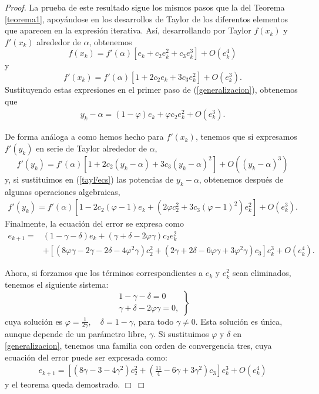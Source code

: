 \begin{proof}
	La prueba de este resultado sigue los mismos pasos que la del Teorema \ref{teorema1}, apoyándose en los desarrollos de Taylor de los diferentos elementos que aparecen en la expresión iterativa. Así, desarrollando por Taylor $f(x_k)$ y $f'(x_k)$ alrededor de $\alpha$, obtenemos
	\begin{equation*} \label{tay1ecs}
	f(x_k)=f'(\alpha)\left[e_k+c_2e_k^2+c_3e_k^3\right]+O(e_k^4)
	\end{equation*}
	y
	\begin{equation*}\label{tay2ecs}
	f'(x_k)=f'(\alpha)\left[1+2c_2e_k+3c_3e_k^2\right]+O(e_k^3).
	\end{equation*}
	Sustituyendo estas expresiones en el primer paso de (\ref{generalizacion}), obtenemos que
	\begin{align*}\label{eqy}
	y_k-\alpha  \nonumber =  (1-\varphi)e_k+\varphi c_2e_k^2+O(e_k^3).
	\end{align*}
	
	De forma análoga a como hemos hecho para $f'(x_k)$, tenemos que si expresamos $f'(y_k)$ en serie de Taylor alrededor de $\alpha$,
	\begin{equation}\label{tayFecs}
	f'(y_k) = f'(\alpha)\left[1+2c_2(y_k-\alpha)+3c_3(y_k-\alpha)^2\right]+O((y_k-\alpha)^3)
	\end{equation}
	y, si sustituimos en (\ref{tayFecs}) las potencias de $y_k-\alpha$, obtenemos después de algunas operaciones algebraicas,
	\begin{align*} \label{tay5ecs}
	f'(y_k)=f'(\alpha)\left[1-2c_2(\varphi-1)e_k+(2\varphi c_2^2+3c_3(\varphi -1)^2)e_k^2\right]+O(e_k^3).
	\end{align*}
	Finalmente, la ecuación del error se expresa como
	\begin{align}
	e_{k+1} = & (1-\gamma-\delta)e_k+(\gamma+\delta-2\varphi\gamma)c_2e_k^2\\\nonumber &+\left[(8\varphi\gamma-2\gamma-2\delta-4\varphi^2\gamma)c_2^2+(2\gamma+2\delta-6\varphi\gamma+3\varphi^2\gamma)c_3\right]e_k^3+O(e_k^4).
	\end{align}
	
	Ahora, si forzamos que los términos correspondientes a $e_k$ y $e_k^2$ sean eliminados, tenemos el siguiente sistema:
	\begin{equation*}
	\left.
	\begin{array}{r}
	1-\gamma-\delta=0 \\
	\gamma+\delta-2\varphi\gamma=0,
	\end{array}
	\right\}
	\end{equation*}
	cuya solución es $\varphi=\frac{1}{2\gamma},\quad \delta=1-\gamma$, para todo $\gamma \neq 0$. Esta solución es única, aunque depende de un parámetro libre, $\gamma$. Si sustituimos $\varphi$ y $\delta$ en \eqref{generalizacion}, tenemos una familia con orden de convergencia tres, cuya ecuación del error puede ser expresada como:
	\begin{align}\label{ecuacionerrorhomeier}
	e_{k+1} = \left[\left(8\gamma-3-4\gamma^2\right)c_2^2+\left(\frac{11}{4}-6\gamma+3\gamma^2\right)c_3\right]e_k^3+O(e_k^4)
	\end{align}
	y el teorema queda demostrado. $\Box$
\end{proof}

